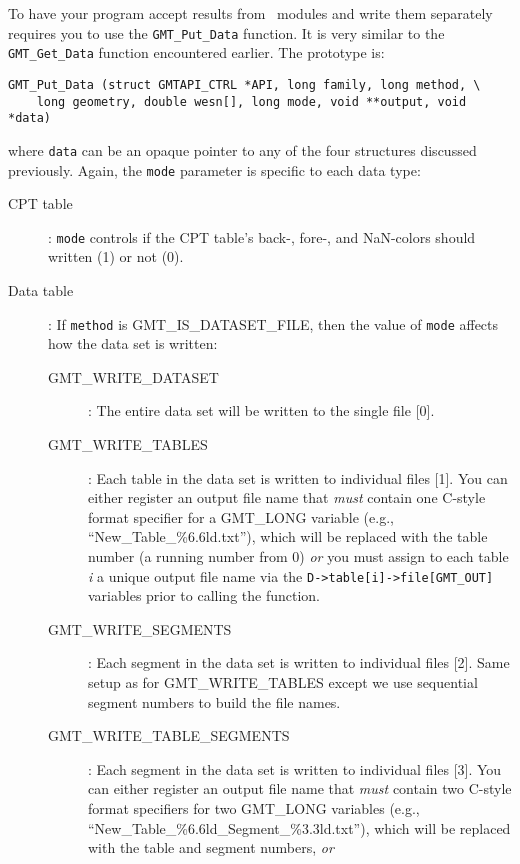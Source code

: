 \documentclass{report}
\begin{document}
To have your program accept results from \GMT\ modules and write them
separately requires you to use the \texttt{GMT\_Put\_Data} function.  It is
very similar to the \texttt{GMT\_Get\_Data} function encountered earlier.
The prototype is:

\begin{verbatim}
GMT_Put_Data (struct GMTAPI_CTRL *API, long family, long method, \
    long geometry, double wesn[], long mode, void **output, void *data)
\end{verbatim}
where \texttt{data} can be an opaque pointer to any of the four structures
discussed previously.  Again, the \texttt{mode} parameter is specific to
each data type:

\begin{description}
\item [CPT table]: \texttt{mode} controls if the CPT table's back-, fore-, and NaN-colors
should written (1) or not (0).
\item [Data table]: If \texttt{method} is GMT\_IS\_DATASET\_FILE, then the value of
\texttt{mode} affects how the data set is written:
\begin{description}
\item [GMT\_WRITE\_DATASET]: The entire data set will be written to the single file [0].
\index{GMT\_WRITE\_DATASET}
\item [GMT\_WRITE\_TABLES]: Each table in the data set is written to individual files [1].
You can either register an output file name that \emph{must} contain one C-style
format specifier for a GMT\_LONG variable (e.g., ``New\_Table\_\%6.6ld.txt''), which will be
replaced with the table number (a running number from 0) \emph{or} you must assign
to each table \emph{i} a unique output file name via the \texttt{D->table[i]->file[GMT\_OUT]}
variables prior to calling the function.
\item [GMT\_WRITE\_SEGMENTS]: Each segment in the data set is written to individual files [2].
Same setup as for GMT\_WRITE\_TABLES except we use sequential segment numbers to build the file names.
\index{GMT\_WRITE\_SEGMENTS}
\item [GMT\_WRITE\_TABLE\_SEGMENTS]: Each segment in the data set is written to individual files [3].
You can either register an output file name that \emph{must} contain two C-style
format specifiers for two GMT\_LONG variables (e.g., ``New\_Table\_\%6.6ld\_Segment\_\%3.3ld.txt''),
which will be replaced with the table and segment numbers, \emph{or}

\end{description}
\end{description}
\end{document}
